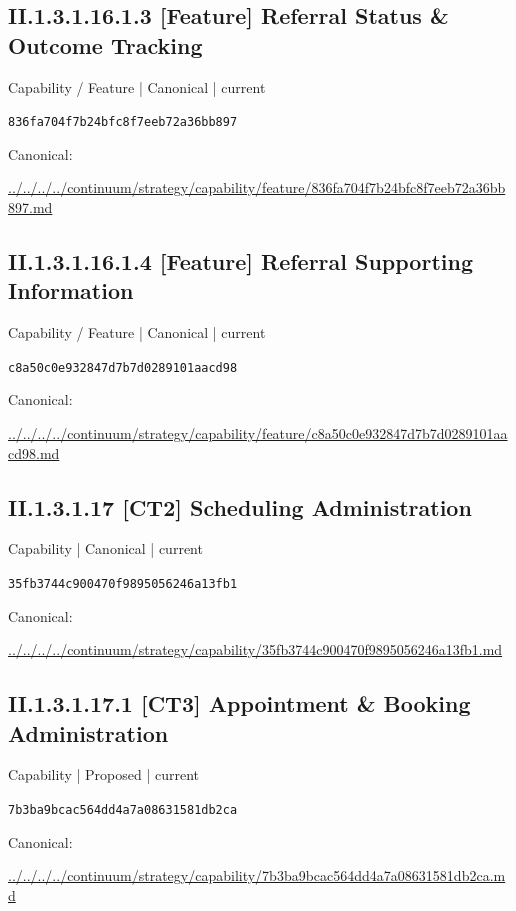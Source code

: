 \documentclass[10pt,a4paper]{article}
\begin{document}
\subsection*{II.1.3.1.16.1.3 [Feature] Referral Status \& Outcome Tracking}
{\small Capability / Feature | Canonical | current}\par
\texttt{836fa704f7b24bfc8f7eeb72a36bb897}\par
Canonical: \par
{\footnotesize\url{../../../../continuum/strategy/capability/feature/836fa704f7b24bfc8f7eeb72a36bb897.md}}\par
\subsection*{II.1.3.1.16.1.4 [Feature] Referral Supporting Information}
{\small Capability / Feature | Canonical | current}\par
\texttt{c8a50c0e932847d7b7d0289101aacd98}\par
Canonical: \par
{\footnotesize\url{../../../../continuum/strategy/capability/feature/c8a50c0e932847d7b7d0289101aacd98.md}}\par
\subsection*{II.1.3.1.17 [CT2] Scheduling Administration}
{\small Capability | Canonical | current}\par
\texttt{35fb3744c900470f9895056246a13fb1}\par
Canonical: \par
{\footnotesize\url{../../../../continuum/strategy/capability/35fb3744c900470f9895056246a13fb1.md}}\par
\subsection*{II.1.3.1.17.1 [CT3] Appointment \& Booking Administration}
{\small Capability | Proposed | current}\par
\texttt{7b3ba9bcac564dd4a7a08631581db2ca}\par
Canonical: \par
{\footnotesize\url{../../../../continuum/strategy/capability/7b3ba9bcac564dd4a7a08631581db2ca.md}}\par
\end{document}
